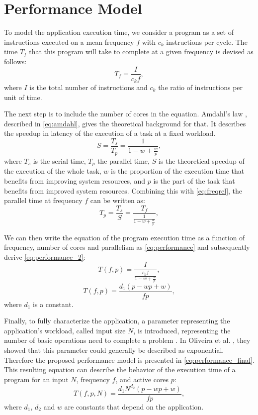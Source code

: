 \section{Performance Model} \label{sec:performancemodel}
To model the application execution time, we consider a program as a set of instructions executed on a mean frequency $f$ with $c_k$ instructions per cycle. The time $T_f$ that this program will take to complete at a given frequency is devised as follows:
\begin{equation}
T_f=\frac{I}{c_kf},
\label{eq:freqrel}
\end{equation}
where $I$ is the total number of instructions and $c_k$ the ratio of instructions per unit of time.

The next step is to include the number of cores in the equation. Amdahl's law \cite{Amdahl1967ValidityCapabilities}, described in \cref{eq:amdahl}, gives the theoretical background for that. It describes the speedup in latency of the execution of a task at a fixed workload.
\begin{equation}
S=\frac{T_s}{T_p}=\frac{1}{1-w+\frac{w}{p}},
\label{eq:amdahl}
\end{equation}
where $T_s$ is the serial time, $T_p$ the parallel time, $S$ is the theoretical speedup of the execution of the whole task, $w$ is the proportion of the execution time that benefits from improving system resources, and $p$ is the part of the task that benefits from improved system resources. Combining this with \cref{eq:freqrel}, the parallel time at frequency $f$ can be written as:
\begin{equation}
T_p=\frac{T_s}{S}=\frac{T_f}{\frac{1}{1-w+\frac{w}{p}}},
\label{eq:parallel_time}
\end{equation}

We can then write the equation of the program execution time as a function of frequency, number of cores and parallelism  as \cref{eq:performance} and subsequently derive \cref{eq:performance_2}:
\begin{equation}
T(f,p)=\frac{I}{ \frac{c_kf}{1-w+\frac{w}{p}} },
\label{eq:performance}
\end{equation}
\begin{equation}
T(f,p)=\frac{d_1(p-wp+w)}{fp},
\label{eq:performance_2}
\end{equation}
where $d_1$ is a constant.

Finally, to fully characterize the application, a parameter representing the application's workload, called input size $N$, is introduced, representing the number of basic operations need to complete a problem \cite{Kumar1994AnalyzingArchitectures}. In Oliveira et al. \cite{Oliveira2018ApplicationCores}, they showed that this parameter could generally be described as exponential. Therefore the proposed performance model is presented in \cref{eq:performance_final}. This resulting equation can describe the behavior of the execution time of a program for an input $N$, frequency $f$, and active cores $p$:
\begin{equation}
T(f,p,N)=\frac{d_1N^{d_2}(p-wp+w)}{fp},
\label{eq:performance_final}
\end{equation}
where $d_1$, $d_2$ and $w$ are constants that depend on the application. 

